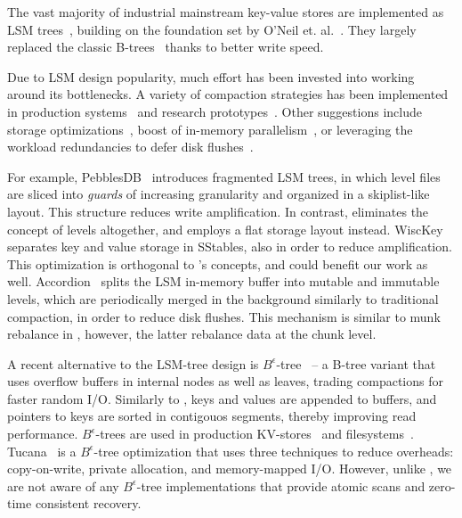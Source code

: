 

The vast majority of industrial mainstream key-value stores are  implemented as LSM trees~\cite{hbase, 
RocksDB, scylladb, Bigtable2008, cassandra2010}, building on the foundation set by O'Neil 
et. al.~\cite{O'Neil1996, Muth1998}. They largely replaced the classic B-trees~\cite{Knuth:1997}
thanks to better write speed. 

Due to LSM design popularity, much effort has been invested into working around its bottlenecks.
A variety of compaction strategies has been implemented in production systems~\cite{CallaghanCompaction, 
ScyllaCompaction} and research prototypes~\cite{triad, PebblesDB}. Other suggestions include storage
optimizations~\cite{WiscKey, PebblesDB}, boost of in-memory parallelism~\cite{clsm2015}, or leveraging 
the workload redundancies to defer disk flushes~\cite{triad, accordion}. 

For example, PebblesDB~\cite{PebblesDB} introduces fragmented LSM trees, in which level files are 
sliced into {\em guards\/} of increasing granularity and organized in a skiplist-like layout. This structure 
reduces write amplification. In contrast, \sys\/ eliminates the concept of levels altogether, 
and employs a flat storage layout instead. WiscKey~\cite{WiscKey} separates key and value storage 
in SStables, also in order to reduce amplification. This optimization is orthogonal to \sys's concepts,
and could benefit our work as well. Accordion~\cite{accordion} splits the LSM in-memory buffer into mutable 
and immutable levels, which are periodically merged in the background similarly to traditional compaction, 
in order to reduce disk flushes. This mechanism is similar to munk rebalance in \sys, 
however, the latter rebalance data at the chunk level.

A recent alternative to the LSM-tree design is $B^{\epsilon}$-tree~\cite{Brodal:2003:LBE:644108.644201} -- a 
B-tree variant that uses overflow buffers in internal nodes as well as leaves, trading compactions for faster random I/O. 
Similarly to \sys, keys and values are appended to buffers, and pointers to keys are sorted in contigouos segments, 
thereby improving read performance. $B^{\epsilon}$-trees are used in production KV-stores~\cite{TokuDB} and filesystems~\cite{BetrFS}. 
Tucana~\cite{tucana} is a $B^{\epsilon}$-tree optimization that uses three techniques to reduce overheads: copy-on-write, private allocation, 
and memory-mapped I/O. However, unlike \sys, we are not aware of any $B^{\epsilon}$-tree implementations that provide atomic scans 
and zero-time consistent recovery. 

